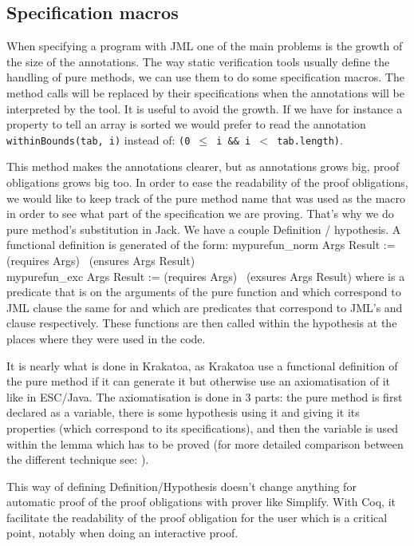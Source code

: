 \subsection{Specification macros}

When specifying a program with JML one of the main problems is the 
growth of the size of the annotations. 
The way static verification tools usually define the handling 
of pure methods, we can use them to do some specification macros.
The method calls will be replaced by their specifications when the 
annotations will be interpreted by the tool. It is useful to avoid the growth.
If we have for instance a property to tell an array is sorted we would 
prefer to read the annotation
{\tt withinBounds(tab, i)}
instead of: {\tt (0 $\le$ i \&\& i $<$ tab.length)}.

This method makes the annotations clearer, but as annotations 
grows big, proof obligations grows big too. In order to ease the readability 
of the proof obligations, we would like to keep track of the pure method name
that was used as the macro in order to see what part of the specification we 
are proving. That's why we do pure method's substitution in Jack.
We have a couple Definition / hypothesis.
A functional definition is generated of the form:
\btab
mypurefun\_norm  Args Result := (requires Args) \rarrow 
\ (ensures Args Result)\\
mypurefun\_exc  Args Result := (requires Args) \rarrow 
\ (exsures Args Result) \etab
where  is a predicate that is on the arguments of 
the pure function and which correspond to JML  
clause the same for  and  
which are predicates that correspond to JML's  and 
 clause respectively.
These functions are then called within the hypothesis at the places 
where they were used in the code. 

It is nearly what is done in Krakatoa\cite{MPMU-04-JLAP}, as
Krakatoa use a functional definition of the pure method if it can generate it
but otherwise use an axiomatisation of it like in ESC/Java\cite{COKK-04-ESCJ}.
The axiomatisation is done in 3 parts: the pure method is first declared 
as a variable, there is some hypothesis  using it and giving 
it its properties (which correspond to its specifications), 
and then the variable is used within the lemma which has to be 
proved (for more detailed comparison between 
the different technique see: \cite{COK-04-METH,DarvasMueller-05}).

This way of defining Definition/Hypothesis doesn't change anything 
for automatic proof of the proof obligations with prover like Simplify. 
With Coq,
it facilitate the readability of the proof obligation for the user which 
is a critical point, notably when doing an interactive proof.

